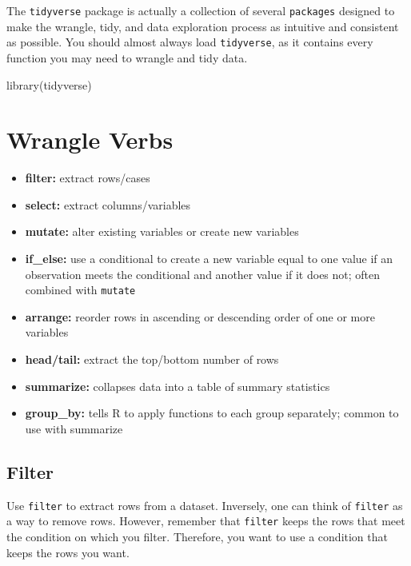 \documentclass[
]{book}
\makeatletter
\newenvironment{Shaded}{\begin{snugshade}}{\end{snugshade}}
\newcommand{\FunctionTok}[1]{\textcolor[rgb]{0,0,0}{#1}}
\newcommand{\NormalTok}[1]{#1}
\providecommand{\tightlist}{%
  \setlength{\itemsep}{0pt}\setlength{\parskip}{0pt}}
\newenvironment{kframe}{%
\medskip{}
\setlength{\fboxsep}{.8em}
 \def\at@end@of@kframe{}%
 \ifinner\ifhmode%
  \def\at@end@of@kframe{\end{minipage}}%
  \begin{minipage}{\columnwidth}%
 \fi\fi%
 \def\FrameCommand##1{\hskip\@totalleftmargin \hskip-\fboxsep
 \colorbox{shadecolor}{##1}\hskip-\fboxsep
     \hskip-\linewidth \hskip-\@totalleftmargin \hskip\columnwidth}%
 \MakeFramed {\advance\hsize-\width
   \@totalleftmargin\z@ \linewidth\hsize
   \@setminipage}}%
 {\par\unskip\endMakeFramed%
 \at@end@of@kframe}
\renewenvironment{Shaded}{\begin{kframe}}{\end{kframe}}
\makeatother
\begin{document}
The \texttt{tidyverse} package is actually a collection of several \texttt{packages} designed to make the wrangle, tidy, and data exploration process as intuitive and consistent as possible. You should almost always load \texttt{tidyverse}, as it contains every function you may need to wrangle and tidy data.

\begin{Shaded}
\begin{Highlighting}[]
\FunctionTok{library}\NormalTok{(tidyverse)}
\end{Highlighting}
\end{Shaded}

\hypertarget{wrangle-verbs}{%
\section{Wrangle Verbs}\label{wrangle-verbs}}

\begin{itemize}
\tightlist
\item
  \textbf{filter:} extract rows/cases
\item
  \textbf{select:} extract columns/variables
\item
  \textbf{mutate:} alter existing variables or create new variables
\item
  \textbf{if\_else:} use a conditional to create a new variable equal to one value if an observation meets the conditional and another value if it does not; often combined with \texttt{mutate}
\item
  \textbf{arrange:} reorder rows in ascending or descending order of one or more variables
\item
  \textbf{head/tail:} extract the top/bottom number of rows
\item
  \textbf{summarize:} collapses data into a table of summary statistics
\item
  \textbf{group\_by:} tells R to apply functions to each group separately; common to use with summarize
\end{itemize}

\hypertarget{filter}{%
\subsection{Filter}\label{filter}}

Use \texttt{filter} to extract rows from a dataset. Inversely, one can think of \texttt{filter} as a way to remove rows. However, remember that \texttt{filter} keeps the rows that meet the condition on which you filter. Therefore, you want to use a condition that keeps the rows you want.
\end{document}
